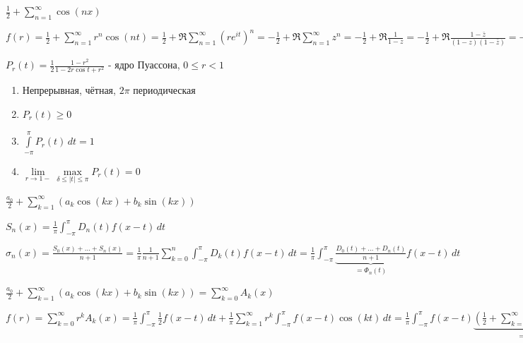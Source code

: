 \begin{example}
    $\frac{1}{2} + \sum\limits_{n=1}^\infty \cos (nx)$

    $f(r) = \frac{1}{2} + \sum\limits_{n=1}^\infty r^n \cos (nt) = \frac{1}{2} + \Re \sum\limits_{n=1}^\infty (re^{it})^n = -\frac{1}{2} + \Re \sum\limits_{n=1}^\infty z^n = - \frac{1}{2} + \Re \frac{1}{1 - z} = - \frac{1}{2} + \Re \frac{1 - \bar{z}}{(1 - z)(1 - \bar{z})} = -\frac{1}{2} + \frac{1 - \Re z}{1 + |z|^2 - 2\Re z} =
    - \frac{1}{2} + \frac{1 - r\cos t}{1 - 2r \cos t + r^2} = \frac{1 - r^2}{2(1 - 2r \cos t + r^2)}$
\end{example}

\begin{definition}
    $P_r (t) = \frac{1}{2} \frac{1 - r^2}{1 - 2r \cos t + r^2}$ - ядро Пуассона, $0 \leqslant r < 1$
\end{definition}

\begin{properties}
    \begin{enumerate}
        \item Непрерывная, чётная, $2\pi$ периодическая
        \item {
            $P_r (t) \geqslant 0$
        }
        \item {
            $\int\limits_{-\pi}^\pi P_r (t) \, dt = 1$
        }
        \item {
            $\lim\limits_{r \to 1-} \max\limits_{\delta \leqslant |t| \leqslant \pi} P_r (t) = 0$
        }
    \end{enumerate}

\end{properties}

\begin{example}
    $\frac{a_0}{2} + \sum\limits_{k = 1}^\infty (a_k \cos (kx) + b_k \sin (kx))$

    $S_n (x) = \frac{1}{\pi} \int_{-\pi}^\pi D_n (t) f(x - t) \, dt$

    $\sigma_n (x) = \frac{S_0 (x) + \ldots + S_n (x)}{n + 1} = \frac{1}{\pi} \frac{1}{n+1} \sum\limits_{k = 0}^n \int_{-\pi}^\pi D_k (t) f(x - t) \, dt = \frac{1}{\pi} \int_{-\pi}^\pi \underbrace{\frac{D_0 (t) + \ldots + D_n (t)}{n + 1}}_{=\Phi_n (t)} f(x - t) \, dt $
\end{example}

\begin{example}
    $\frac{a_0}{2} + \sum\limits_{k = 1}^\infty (a_k \cos (kx) + b_k \sin (kx)) = \sum\limits_{k = 0}^\infty A_k (x)$

    $f(r) = \sum\limits_{k = 0}^\infty r^k A_k (x) = \frac{1}{\pi} \int_{-\pi}^\pi \frac{1}{2} f(x - t) \, dt + \frac{1}{\pi} \sum\limits_{k=1}^\infty r^k \int_{-\pi}^\pi f(x - t) \cos (kt) \, dt =
    \frac{1}{\pi} \int_{-\pi}^\pi f(x - t) \underbrace{\left( \frac{1}{2} + \sum\limits_{k = 1}^\infty r^k \cos (kt) \right)}_{= P_r (t)} \, dt$
\end{example}

